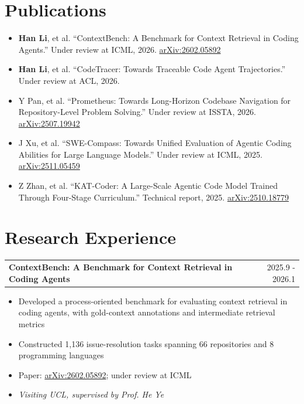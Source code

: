 \documentclass[a4paper,12pt]{article}
\makeatletter
\newenvironment{joblong}[2]
    {
    \begin{tabularx}{\linewidth}{@{}X r@{}}
    \textbf{#1} & #2 \\[3.75pt]
    \end{tabularx}
    \begin{minipage}[t]{\linewidth}
    \begin{itemize}[nosep,after=\strut, leftmargin=1em, itemsep=3pt,label=--]
    }
    {
    \end{itemize}
    \end{minipage}    
    }
\makeatother
\begin{document}
\section{Publications}
\begin{itemize}[nosep,after=\strut, leftmargin=1em, itemsep=3pt,label=--]
\item \textbf{Han Li}, et al. ``ContextBench: A Benchmark for Context Retrieval in Coding Agents.'' Under review at ICML, 2026. \href{https://arxiv.org/abs/2602.05892}{arXiv:2602.05892}
\item \textbf{Han Li}, et al. ``CodeTracer: Towards Traceable Code Agent Trajectories.'' Under review at ACL, 2026.
\item Y Pan, et al. ``Prometheus: Towards Long-Horizon Codebase Navigation for Repository-Level Problem Solving.'' Under review at ISSTA, 2026. \href{https://arxiv.org/abs/2507.19942}{arXiv:2507.19942}
\item J Xu, et al. ``SWE-Compass: Towards Unified Evaluation of Agentic Coding Abilities for Large Language Models.'' Under review at ICML, 2025. \href{https://arxiv.org/abs/2511.05459}{arXiv:2511.05459}
\item Z Zhan, et al. ``KAT-Coder: A Large-Scale Agentic Code Model Trained Through Four-Stage Curriculum.'' Technical report, 2025. \href{https://arxiv.org/abs/2510.18779}{arXiv:2510.18779}
\end{itemize}

\section{Research Experience}

\begin{joblong}{ContextBench: A Benchmark for Context Retrieval in Coding Agents}{2025.9 - 2026.1}
\item Developed a process-oriented benchmark for evaluating context retrieval in coding agents, with gold-context annotations and intermediate retrieval metrics
\item Constructed 1,136 issue-resolution tasks spanning 66 repositories and 8 programming languages
\item Paper: \href{https://arxiv.org/abs/2602.05892}{arXiv:2602.05892}; under review at ICML
\item \textit{Visiting UCL, supervised by Prof. He Ye}
\end{joblong}
\end{document}

